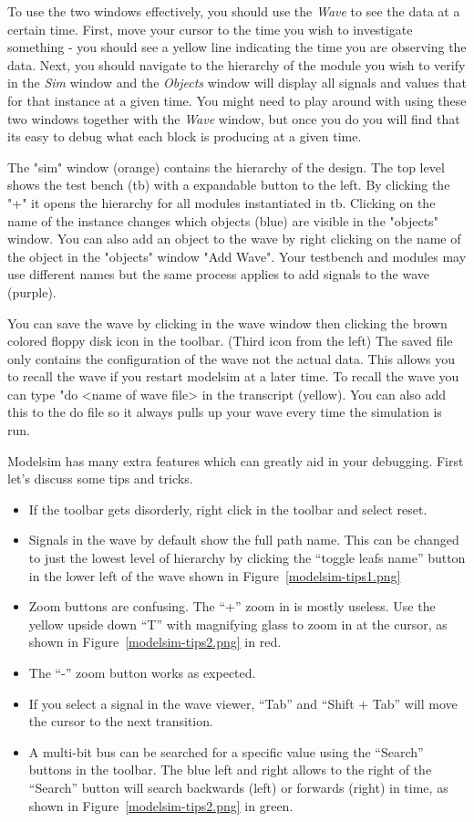 \documentclass{article}
\begin{document}
To use the two windows effectively, you should use the \textit{Wave}
to see the data at a certain time.  First, move your cursor to the
time you wish to investigate something - you should see a yellow line
indicating the time you are observing the data.  Next, you
should navigate to the
hierarchy of the module you wish to verify in the \textit{Sim} window
and the \textit{Objects} window will display all signals and values
that for that instance at a given time.  You might need to play around
with using these two windows together with the \textit{Wave} window,
but once you do you will find that its easy to debug what each block
is producing at a given time.

The "sim" window (orange) contains the hierarchy of the design.  The
top level shows the test bench (tb) with a expandable button to the
left.
By clicking the "+" it opens the hierarchy for all modules
instantiated in tb.  Clicking on the name of the instance changes
which objects (blue) are visible in the "objects" window.  You can
also add an
object to the wave by right clicking on the name of the object in the
"objects" window "Add Wave".  Your testbench and modules may use
different names but the same process applies to add signals to the
wave (purple).

You can save the wave by clicking in the wave window then clicking the
brown colored floppy disk icon in the toolbar.  (Third icon from the
left)  The saved file only contains the configuration of the wave not
the actual data. This allows you to recall the wave if you restart
modelsim at a later time.  To recall the wave you can type "do <name
of wave file> in the transcript (yellow).  You can also add this to
the do file so it always pulls up your wave every time the simulation
is run.

Modelsim has many extra features which can greatly aid in your debugging.
First let's discuss some tips and tricks.
\begin{itemize}
\item  If the toolbar gets disorderly, right click in the toolbar and
  select reset.
\item Signals in the wave by default show the full path name.  This can
  be changed to just the lowest level of hierarchy by clicking the
  ``toggle leafs name'' button in the lower left of the wave shown in
  Figure~\ref{modelsim-tips1.png}  
\item Zoom buttons are confusing.  The ``+'' zoom in is mostly useless.
  Use the yellow upside down ``T'' with magnifying glass to zoom in
  at the cursor, as shown in Figure~\ref{modelsim-tips2.png} in red.
\item The ``-'' zoom button works as expected.
\item If you select a signal in the wave viewer, ``Tab'' and ``Shift + Tab''
  will move the cursor to the next transition.
\item A multi-bit bus can be searched for a specific value using the ``Search''
  buttons in the toolbar.  The blue left and right allows to the right of
  the ``Search'' button will search backwards (left) or forwards (right)
  in time, as shown in Figure~\ref{modelsim-tips2.png} in green.
\end{itemize}
\end{document}
